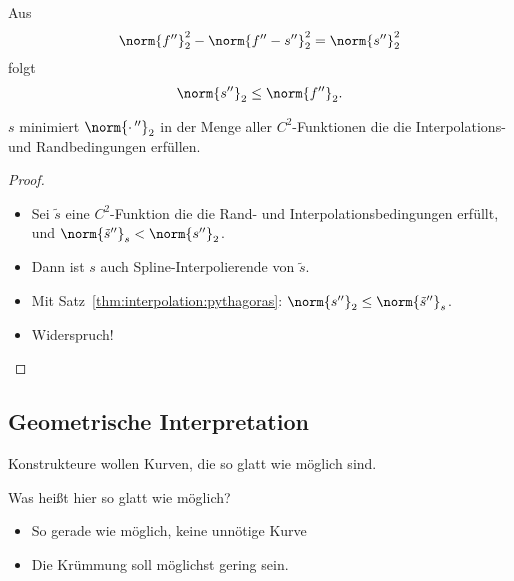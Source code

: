 Aus
\begin{equation*}
 \norm{f''}_2^2 - \norm{f'' - s''}_2^2
 =
 \norm{s''}_2^2
\end{equation*}
folgt
\begin{equation*}
 \norm{s''}_2
 \leq
 \norm{f''}_2.
\end{equation*}

\begin{kor}
 $s$ minimiert $\norm{\cdot\,''}_2$ in der Menge aller $C^2$-Funktionen die die Interpolations- und Randbedingungen erfüllen.
\end{kor}
\begin{proof}
\begin{itemize}
 \item Sei $\tilde{s}$ eine $C^2$-Funktion die die Rand- und Interpolationsbedingungen erfüllt,
   und $\norm{\tilde{s}''}_s < \norm{s''}_2$.

 \item Dann ist $s$ auch Spline-Interpolierende von $\tilde{s}$.

 \item Mit Satz~\ref{thm:interpolation:pythagoras}: $\norm{s''}_2 \le \norm{\tilde{s}''}_s$.

 \item Widerspruch!
\end{itemize}

\end{proof}



\subsection{Geometrische Interpretation}

Konstrukteure wollen Kurven, die so glatt wie möglich sind.

\bigskip

Was heißt hier \glqq so glatt wie möglich\grqq{}?
\begin{itemize}
 \item  \glqq So gerade wie möglich, keine unnötige Kurve\grqq

 \item Die \glqq Krümmung\grqq{} soll möglichst gering sein.
\end{itemize}

\bigskip

